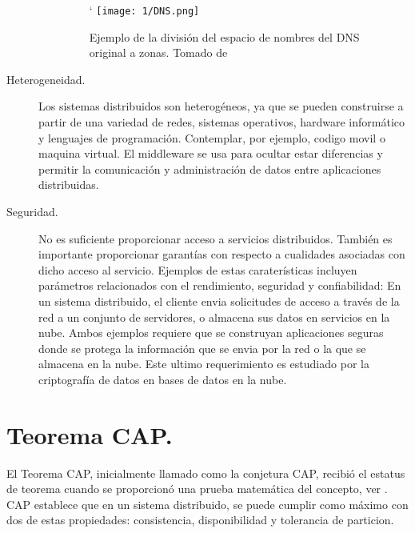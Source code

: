 \begin{description}
\begin{itemize}
			\begin{figure}%
						\begin{center}
				`			\texttt{[image: 1/DNS.png]}
				\caption{Ejemplo de la divisi\'on del espacio de nombres del DNS original a zonas. Tomado de \cite{Steen2017}}
				\label{fig:DNSorg}
						\end{center}
			\end{figure}			
 			
		\end{itemize}
		
		\item[{Heterogeneidad}.]  
		Los sistemas distribuidos son heterogéneos, ya que se pueden construirse a partir de una variedad de redes, sistemas operativos, hardware informático y lenguajes de programación. Contemplar, por ejemplo, \gls{codigo movil} o \gls{maquina virtual}. El \gls{middleware} se usa para ocultar estar diferencias y permitir la comunicación y administración de datos entre aplicaciones distribuidas.
			
		
		\item[{Seguridad.}]  
		  
		No es suficiente proporcionar acceso a servicios distribuidos. También es importante proporcionar garantías con respecto a cualidades asociadas con dicho acceso al servicio.  Ejemplos de estas caraterísticas incluyen parámetros relacionados con el rendimiento, seguridad y confiabilidad:  En un sistema distribuido, el cliente envia solicitudes de acceso a través de la red a un conjunto de servidores, o almacena sus datos en servicios en la nube. Ambos ejemplos requiere que se construyan aplicaciones seguras donde se protega la información que se envia por la red o la que se almacena en la nube. Este ultimo requerimiento es estudiado por la  criptografía de datos en  bases de datos en la nube.
		
	\end{description}

\section{Teorema CAP.}	 El \gls{Teorema CAP}, inicialmente llamado como la conjetura CAP, recibi\'o el estatus de teorema cuando se proporcion\'o una prueba matem\'atica del concepto, ver \cite{Brewer2000}. 
 CAP establece que en un sistema distribuido, se puede cumplir como m\'aximo con dos de estas propiedades: \gls{consistencia}, \gls{disponibilidad} y \gls{tolerancia de particion}. 

